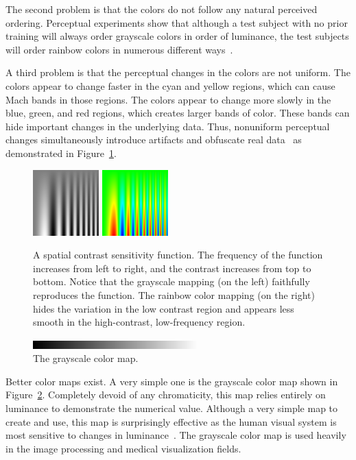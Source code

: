 \documentclass{acmsiggraph}               %
\newcommand{\lcite}[1]{~\cite{#1}}
\begin{document}
The second problem is that the colors do not follow any natural perceived
ordering.  Perceptual experiments show that although a test subject with
no prior training will always order grayscale colors in order of luminance,
the test subjects will order rainbow colors in numerous different
ways\lcite{Ware04}.

A third problem is that the perceptual changes in the colors are not
uniform.  The colors appear to change faster in the cyan and yellow
regions, which can cause Mach bands in those regions.  The colors appear to
change more slowly in the blue, green, and red regions, which creates larger
bands of color.  These bands can hide important changes in the
underlying data.  Thus, nonuniform perceptual changes
simultaneously introduce artifacts and obfuscate real
data\lcite{Borland07} as demonstrated in
Figure~\ref{fig:RainbowSpatialContrast}.

\begin{figure}
  \centering
  \includegraphics[width=1.0in]{images/GrayscaleSpatialContrast}
  \qquad
  \includegraphics[width=1.0in]{images/RainbowSpatialContrast}
  \caption{A spatial contrast sensitivity function.  The frequency of the
    function increases from left to right, and the contrast increases from
    top to bottom.  Notice that the grayscale mapping (on the left)
    faithfully reproduces the function.  The rainbow color mapping (on the
    right) hides the variation in the low contrast region and appears less
    smooth in the high-contrast, low-frequency region.}
  \label{fig:RainbowSpatialContrast}
\end{figure}

\begin{figure}
  \centering
  \includegraphics[width=2.5in]{images/GrayscaleBar}
  \caption{The grayscale color map.}
  \label{fig:GrayscaleColorMap}
\end{figure}
Better color maps exist.  A very simple one is the grayscale
color map shown in Figure~\ref{fig:GrayscaleColorMap}.  Completely devoid
of any chromaticity, this map relies entirely on luminance to demonstrate
the numerical value.  Although a very simple map to create and use, this
map is surprisingly effective as the human visual system is most sensitive
to changes in luminance\lcite{Mullen85,Ware04}.  The grayscale color map is
used heavily in the image processing and medical visualization fields.
\end{document}
